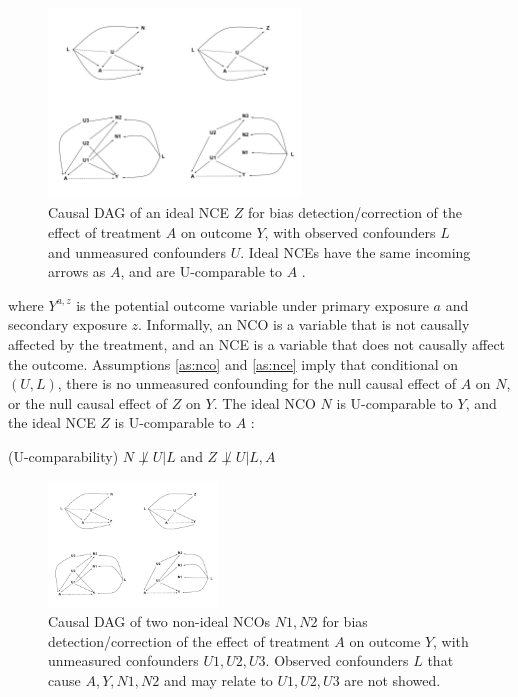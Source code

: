 \begin{figure}[H]
    \centering
    \includegraphics[trim={13cm 11cm 0 1.5cm}, clip, width=0.6\textwidth]{figures/dags.pdf}
    \caption[Causal DAG of an ideal NCE $Z$ for bias detection/correction of the effect of treatment $A$ on outcome $Y$.]{Causal DAG of an ideal NCE $Z$ for bias detection/correction of the effect of treatment $A$ on outcome $Y$, with observed confounders $L$ and unmeasured confounders $U$. Ideal NCEs have the same incoming arrows as $A$, and are U-comparable to $A$ \cite{lipsitch2010negative}.}
    \label{fig:nco-nce-dag}
\end{figure}

\noindent where $Y^{a, z}$ is the potential outcome variable under primary exposure $a$ and secondary exposure $z$. Informally, an NCO is a variable that is not causally affected by the treatment, and an NCE is a variable that does not causally affect the outcome. Assumptions \ref{as:nco} and \ref{as:nce} imply that conditional on $(U, L)$, there is no unmeasured confounding for the null causal effect of $A$ on $N$, or the null causal effect of $Z$ on $Y$. The ideal NCO $N$ is U-comparable to $Y$, and the ideal NCE $Z$ is U-comparable to $A$ \cite{shi2020selective}:

\begin{assumption} (U-comparability) \label{as:ucomparability}
  $N \not\perp U | L$ and $Z \not\perp U | L, A$
\end{assumption}

\begin{figure}
    \centering
    \includegraphics[trim={0 1cm 18cm 10cm}, clip, width=0.4\textwidth]{figures/dags.pdf}
    \caption[Causal DAG of two non-ideal NCOs $N1, N2$ for bias detection/correction of the effect of treatment $A$ on outcome $Y$.]{Causal DAG of two non-ideal NCOs $N1, N2$ for bias detection/correction of the effect of treatment $A$ on outcome $Y$, with unmeasured confounders $U1, U2, U3$. Observed confounders $L$ that cause $A, Y, N1, N2$ and may relate to $U1, U2, U3$ are not showed.}
    \label{fig:nco-nonideal-dag}
\end{figure}

